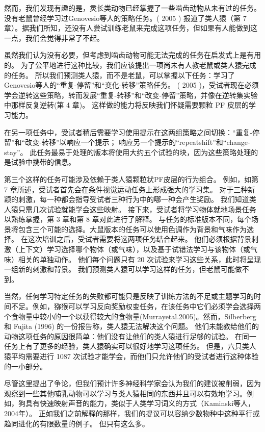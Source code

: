 \par 
然而，我们发现有趣的是，灵长类动物已经掌握了一些啮齿动物从未有过的任务。 没有老鼠曾经学习过Genovesio等人的策略任务。( 2005 ) 报道了类人猿（第 7 章）。据我们所知，还没有人尝试训练老鼠来完成这项任务，但如果有人能做到这一点，我们会觉得非常了不起。
\par 
虽然我们认为没有必要，但考虑到啮齿动物可能无法完成的任务在启发式上是有用的。 为了公平地进行这种比较，我们应该提出一项尚未有人教老鼠或类人猿完成的任务。 所以我们预测类人猿，而不是老鼠，可以掌握以下任务：学习了 Genovesio等人的“重复-停留”和“变化-转移”策略任务。 ( 2005 )，受试者现在必须学会逆转这些策略，转而发展“重复-转移”和“改变-停留”策略，并像在逆转集实验中那样反复逆转(第 4 章)。 这样做的能力将反映我们怀疑需要颗粒 PF 皮层的学习能力。
\par 
在另一项任务中，受试者稍后需要学习使用提示在这两组策略之间切换：“重复-停留”和“改变-转移”以响应一个提示； 响应另一个提示的“repeatshift”和“change-stay”。 此任务最易于处理的版本将使用大约五个试验的块，因为这些策略处理的是试验中携带的信息。
\par 
第三个这样的任务可能涉及依赖于类人猿颗粒状PF皮层的行为组合。 例如，如第 7 章所述，受试者首先会在条件视觉运动任务上形成强大的学习集。 对于三种新颖的刺激，每一种都会指导受试者三种行为中的哪一种会产生奖励。 我们知道类人猿只需几次试验就能学会这些映射。 接下来，受试者将学习物体就地场景任务以熟练掌握，第 3 章和第 8 章对此进行了解释。 与任务的标准版本不同，每个场景将包含三个可能的选择。大鼠版本的任务可以使用色调作为背景和气味作为选择。 在这次培训之后，受试者需要将这两项任务结合起来。 他们必须根据背景刺激（上下文）学习选择哪个物体（或气味），以及基于试错法学习与该物体（或气味）相关的单独动作。 他们每个问题只有 20 次试验来学习这些关系，此时将呈现一组新的刺激和背景。 我们预测类人猿可以学习这样的任务，但老鼠可能做不到。
\par 
当然，任何学习特定任务的失败都可能只是反映了训练方法的不足或主题学习的时间不足。例如，猕猴可以学习反向奖励权变任务，在该任务中它们必须学会选择两个食物量中较小的一个以获得较大的食物量(Murrayetal.2005)。然而，Silberberg 和 Fujita (1996) 的一份报告称，类人猿无法解决这个问题。 他们未能教给他们的动物这项任务的原因很简单：他们没有让他们的类人猿进行足够的试验。 在同一任务上有了更多的经验，类人猿确实可以很好地学习这项任务。 但是，六只类人猿平均需要进行 1087 次试验才能学会，而他们只允许他们的受试者进行这种体验的一小部分。
\par 
尽管这里提出了争论，但我们预计许多神经科学家会认为我们的建议被削弱，因为观察到一些其他哺乳动物可以学习与类人猿相同的东西并且可以有效地学习。例如，狗具有快速映射声音的能力，类似于人类学习词义的方式（Kaminski等人，2004年）。 正如我们之前解释的那样，我们的提议可以容纳少数物种中这种平行或趋同进化的有限数量的例子。 但只有这么多。
